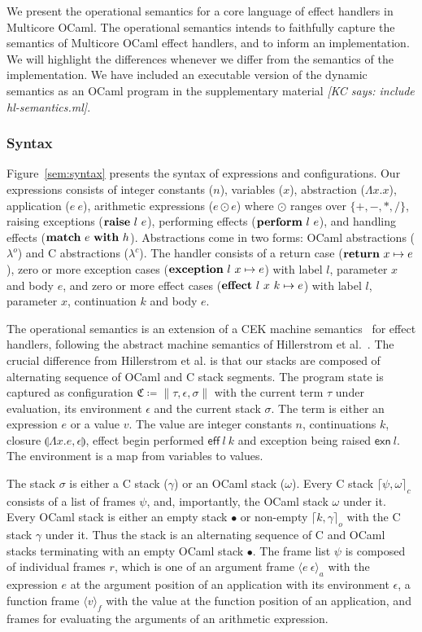 \documentclass[sigplan,10pt,review,anonymous]{acmart}\settopmatter{printfolios=true,printccs=false,printacmref=false}
\newcommand{\kc}[1]{{\color{red} {\it [KC says: #1]}}}
\newcommand{\lam}[2]{\Lambda #1. #2}
\newcommand{\env}{\epsilon}
\newcommand{\clos}[3]{\llparenthesis \lam{#1}{#2}, #3 \rrparenthesis}
\newcommand{\kw}[1]{\text{\bf #1}}
\newcommand{\effval}[2]{\textsf{eff} ~#1 ~#2}
\newcommand{\exnval}[1]{\textsf{exn} ~#1}
\newcommand{\handle}[2]{\kw{match} ~#1 ~\kw{with} ~#2}
\newcommand{\throw}[2]{\kw{raise} ~#1 ~#2}
\newcommand{\perform}[2]{\kw{perform} ~#1 ~#2}
\newcommand{\caseval}[2]{\kw{return}~#1 \mapsto #2}
\newcommand{\caseexn}[3]{\kw{exception} ~#1 ~#2 \mapsto #3}
\newcommand{\caseeff}[4]{\kw{effect} ~#1 ~#2 ~#3 \mapsto #4}
\newcommand{\farg}[2]{\langle #1 ~#2 \rangle_a}
\newcommand{\ffun}[1]{\langle #1 \rangle_f}
\newcommand{\fl}{\psi} %
\newcommand{\cstack}{\gamma} %
\newcommand{\ostack}{\omega} %
\newcommand{\cstacka}[2]{\big \lceil #1, #2 \big \rceil_c} %
\newcommand{\ostacka}[2]{\big \lceil #1, #2 \big \rceil_o} %
\newcommand{\ostackemp}{\bullet}
\newcommand{\stack}{\sigma}
\newcommand{\config}{\mathfrak{C}}
\newcommand{\configa}[3]{\|#1,#2,#3\|}
\begin{document}
We present the operational semantics for a core language of effect handlers in
Multicore OCaml. The operational semantics intends to faithfully capture the
semantics of Multicore OCaml effect handlers, and to inform an implementation.
We will highlight the differences whenever we differ from the semantics of the
implementation. We have included an executable version of the dynamic semantics
as an OCaml program in the supplementary material \kc{include hl-semantics.ml}.

\subsubsection{Syntax}

Figure~\ref{sem:syntax} presents the syntax of expressions and configurations.
Our expressions consists of integer constants ($n$), variables ($x$),
abstraction ($\lam{x}{x}$), application ($e~e$), arithmetic expressions ($e
\odot e$) where $\odot$ ranges over $\{+,-,*,/\}$, raising exceptions
($\throw{l}{e}$), performing effects ($\perform{l}{e}$), and handling effects
($\handle{e}{h}$). Abstractions come in two forms: OCaml abstractions
($\lambda^o$) and C abstractions ($\lambda^c$). The handler consists of a
return case ($\caseval{x}{e}$), zero or more exception cases
($\caseexn{l}{x}{e}$) with label $l$, parameter $x$ and body $e$, and zero or
more effect cases ($\caseeff{l}{x}{k}{e}$) with label $l$, parameter $x$,
continuation $k$ and body $e$.

The operational semantics is an extension of a CEK machine
semantics~\cite{Felleisen} for effect handlers, following the abstract machine
semantics of Hillerstrom et al.~\cite{Hillerstrom2020}. The crucial difference
from Hillerstrom et al. is that our stacks are composed of alternating sequence
of OCaml and C stack segments. The program state is captured as configuration
$\config \coloneqq \configa{\tau}{\env}{\stack}$ with the current term $\tau$
under evaluation, its environment $\env$ and the current stack $\stack$. The
term is either an expression $e$ or a value $v$. The value are integer
constants $n$, continuations $k$, closure $\clos{x}{e}{\env}$, effect begin
performed $\effval{l}{k}$ and exception being raised $\exnval{l}$. The
environment is a map from variables to values.

The stack $\stack$ is either a C stack ($\cstack$) or an OCaml stack
($\ostack$). Every C stack $\cstacka{\fl}{\ostack}$ consists of a list of
frames $\fl$, and, importantly, the OCaml stack $\ostack$ under it. Every OCaml
stack is either an empty stack $\ostackemp$ or non-empty $\ostacka{k}{\cstack}$
with the C stack $\cstack$ under it. Thus the stack is an alternating sequence
of C and OCaml stacks terminating with an empty OCaml stack $\ostackemp$. The
frame list $\fl$ is composed of individual frames $r$, which is one of an
argument frame $\farg{e}{\env}$ with the expression $e$ at the argument
position of an application with its environment $\env$, a function frame
$\ffun{v}$ with the value at the function position of an application, and
frames for evaluating the arguments of an arithmetic expression.
\end{document}
